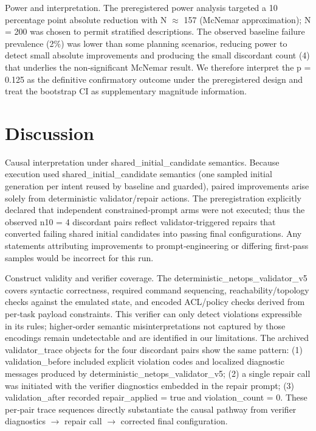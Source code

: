 \documentclass[conference]{IEEEtran}
\begin{document}
Power and interpretation. The preregistered power analysis targeted a 10 percentage point absolute reduction with N \ensuremath{\approx} 157 (McNemar approximation); N = 200 was chosen to permit stratified descriptions. The observed baseline failure prevalence (2\%) was lower than some planning scenarios, reducing power to detect small absolute improvements and producing the small discordant count (4) that underlies the non‑significant McNemar result. We therefore interpret the p = 0.125 as the definitive confirmatory outcome under the preregistered design and treat the bootstrap CI as supplementary magnitude information.

\section{Discussion}
Causal interpretation under shared\_initial\_candidate semantics. Because execution used shared\_initial\_candidate semantics (one sampled initial generation per intent reused by baseline and guarded), paired improvements arise solely from deterministic validator/repair actions. The preregistration explicitly declared that independent constrained‑prompt arms were not executed; thus the observed n10 = 4 discordant pairs reflect validator‑triggered repairs that converted failing shared initial candidates into passing final configurations. Any statements attributing improvements to prompt‑engineering or differing first‑pass samples would be incorrect for this run.

Construct validity and verifier coverage. The deterministic\_netops\_validator\_v5 covers syntactic correctness, required command sequencing, reachability/topology checks against the emulated state, and encoded ACL/policy checks derived from per‑task payload constraints. This verifier can only detect violations expressible in its rules; higher‑order semantic misinterpretations not captured by those encodings remain undetectable and are identified in our limitations. The archived validator\_trace objects for the four discordant pairs show the same pattern: (1) validation\_before included explicit violation codes and localized diagnostic messages produced by deterministic\_netops\_validator\_v5; (2) a single repair call was initiated with the verifier diagnostics embedded in the repair prompt; (3) validation\_after recorded repair\_applied = true and violation\_count = 0. These per‑pair trace sequences directly substantiate the causal pathway from verifier diagnostics \ensuremath{\rightarrow} repair call \ensuremath{\rightarrow} corrected final configuration.
\end{document}
